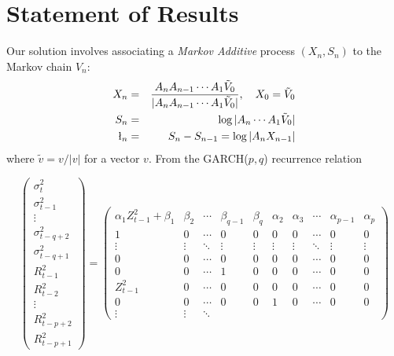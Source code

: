 \section{Statement of Results}
Our solution involves associating a {\em Markov Additive} process
$(X_n, S_n)$ to the Markov chain $V_n$:
\begin{eqnarray*}
X_n &=& {
        A_n A_{n-1} \cdots A_1 \tilde V_0
        \over
        |A_n A_{n-1} \cdots A_1 \tilde V_0|
      }, \quad X_0 = \tilde V_0\\
S_n &=& \log |A_n \cdots A_1 \tilde V_0| \\
\l_n &=& S_n - S_{n-1} = \log |A_n X_{n-1}|
\end{eqnarray*}
where $\tilde v = v/|v|$  for a vector $v$. From the GARCH($p, q$)
recurrence relation
\begin{tiny}
  \begin{equation*}
      \begin{pmatrix}
        \sigma_{t}^2 \\
        \sigma_{t-1}^2 \\
        \vdots \\
        \sigma_{t-q+2}^2 \\
        \sigma_{t-q+1}^2 \\
        R_{t-1}^2 \\
        R_{t-2}^2 \\
        \vdots \\
        R_{t-p+2}^2 \\
        R_{t-p+1}^2
      \end{pmatrix}
      =
      \begin{pmatrix}
        \alpha_1 Z_{t-1}^2 + \beta_1 & \beta_2 & \cdots &
        \beta_{q-1} & \beta_q & \alpha_2 & \alpha_3 &
        \cdots & \alpha_{p-1} & \alpha_p\\
        1 & 0 & \cdots & 
        0 & 0 & 0 & 0 & \cdots & 0 & 0 \\
        \vdots & \vdots & \ddots & 
        \vdots & \vdots & \vdots & \vdots &
        \ddots & \vdots & \vdots \\
        0 & 0 & \cdots &
        0 & 0 & 0 & 0 & \cdots & 0 & 0 \\
        0 & 0 & \cdots &
        1 & 0 & 0 & 0 & \cdots & 0 & 0 \\
        Z_{t-1}^2 & 0 & \cdots &
        0 & 0 & 0 & 0 & \cdots & 0 & 0 \\
        0 & 0 & \cdots &
        0 & 0 & 1 & 0 & \cdots & 0 & 0 \\
        \vdots & \vdots & \ddots &

\end{pmatrix}
\end{equation*}
\end{tiny}
